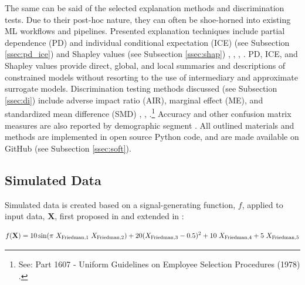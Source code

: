 \documentclass[information,article,submit,moreauthors,pdftex]{definitions/mdpi}
\begin{document}
The same can be said of the selected explanation methods and discrimination tests. Due to their post-hoc nature, they can often be shoe-horned into existing ML workflows and pipelines. Presented explanation techniques include partial dependence (PD) and individual conditional expectation (ICE) (see Subsection \ref{ssec:pd_ice}) and Shapley values (see Subsection \ref{ssec:shap}) \cite{esl}, \cite{ice_plots}, \cite{shapley}, \cite{tree_shap}. PD, ICE, and Shapley values provide direct, global, and local summaries and descriptions of constrained models without resorting to the use of intermediary and approximate surrogate models. Discrimination testing methods discussed (see Subsection \ref{ssec:di}) include adverse impact ratio (AIR), marginal effect (ME), and standardized mean difference (SMD) \cite{feldman2015certifying}, \cite{cohen1988statistical}, \cite{cohen1992power}.\footnote{See: Part 1607 - Uniform Guidelines on Employee Selection Procedures (1978) .} Accuracy and other confusion matrix measures are also reported by demographic segment \cite{zafar2017fairness}. All outlined materials and methods are implemented in open source Python code, and are made available on GitHub (see Subsection \ref{ssec:soft}). 


\subsection{Simulated Data}\label{ssec:sim_data}

Simulated data is created based on a signal-generating function, $f$, applied to input data, $\mathbf{X}$, first proposed in \citet{friedman1979tree} and extended in \citet{friedman1991multivariate}:

\begin{equation}
\begin{aligned}\label{eq:sim}\small
f(\mathbf{X}) = 10\sin(\pi~X_{\text{Friedman},1}~X_{\text{Friedman},2}) + 20(X_{\text{Friedman},3} - 0.5)^2 + 10~X_{\text{Friedman},4} + 5~X_{\text{Friedman},5}
\end{aligned}
\end{equation}
\end{document}
